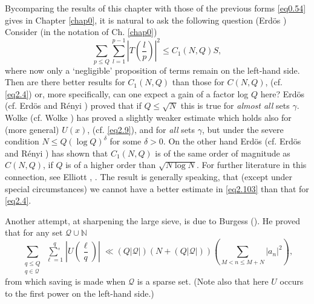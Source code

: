 By\pageoriginale comparing the results of this chapter with those of
the previous 
forms \eqref{eq0.54} gives in Chapter \ref{chap0}, it is natural to ask the
following question (Erd\"os \cite{key3}) Consider (in the notation of
Ch. \ref{chap0})  
\begin{equation*}
\sum_{p \leq Q} \sum_{l=1}^{p-1}|T(\frac{l}{p})|^2 \leq C_1(N,Q)S,
\tag{2.103}\label{eq2.103} 
\end{equation*}
where now only a `negligible' proposition of terms remain on the
left-hand side. Then are there better results for $C_1(N,Q)$ than
those for $C(N,Q)$, (cf. \eqref{eq2.4}) or, more specifically, can one expect a
gain of a factor log $Q$ here? Erd\"os \cite{key3} (cf. Erd\"os and
R\'enyi \cite{key1})
proved that if $Q \leq \sqrt{N}$ this is true for \textit{almost all}
sets $\gamma$. Wolke \cite{key2} (cf. Wolke \cite{key1}) has proved a slightly
weaker estimate which holds also for (more general) $U(x)$,
(cf. \eqref{eq2.9}), and for \textit{all} sets $\gamma$, but under the
severe condition $N \leq Q(\log Q)^{\delta}$ for some $\delta>0$. On
the other hand Erd\"os \cite{key3} (cf. Erd\"os and R\'enyi
\cite{key1}) has shown that 
$C_1(N,Q)$ is of the same order of magnitude as $C(N,Q)$, if $Q$ is of
a higher order than $\sqrt{N \log N}$. For further literature in this
connection, see Elliott \cite{key5}, \cite{key7}. The result is
generally speaking, 
that (except under special circumstances) we cannot have a better
estimate in \eqref{eq2.103} than that for \eqref{eq2.4}. 

Another attempt, at sharpening the large sieve, is due to Burgess
(\cite{key1}). He proved that for any set $\mathscr{Q} \cup \mathbb{N}$ 
\begin{equation*}
\sum\limits_{\substack{q \leq Q\\ q \in
    \mathscr{Q}}}\mathop{\sum{}'}\limits_{\ell=1}^{q}|U(\frac{\ell}{q})| \;  \ll
(Q|\mathscr{Q}|)(N+(Q|\mathscr{Q}|))(\sum_{M < n \leq M + N}|a_n|^2),
\tag{2.104} \label{eq2.104}
\end{equation*}
from which saving is made when $\mathscr{Q}$ is a sparse set. (Note also that
here $U$ occurs to the first power on the left-hand side.) 

